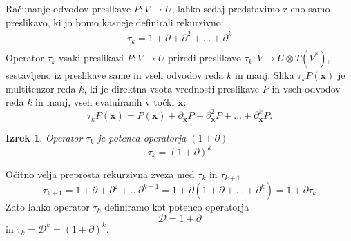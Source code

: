 \documentclass{article}
\newcommand{\x}{\mathbf{x}}
\newcommand{\D}{\partial}
\newcommand{\Dplus}{\mathcal{D}}
\newcommand{\sumd}{\tau}
\newtheorem{izrek}{Izrek}[section]
\begin{document}
Računanje odvodov preslkave $P:V\to U$, lahko sedaj predstavimo z eno samo
preslikavo, ki jo bomo kasneje definirali rekurzivno:
\begin{eqnarray}
  \label{eq:vsi_odvodi}
  \sumd_k = 1+\D +\D^2 +\ldots + \D^k\\ 
\end{eqnarray}
Operator $\sumd_k$ vsaki preslikavi $P: V\to U$ priredi preslikavo $\sumd_k:V\to
U\otimes T(V^*)$, sestavljeno iz preslikave same in vseh odvodov reda $k$ in
manj. Slika $\sumd_kP(\x)$ je multitenzor reda $k$, ki je direktna vsota
vrednosti preslikave $P$ in vseh odvodov reda $k$ in manj, vseh evaluiranih v
točki $\x$:
\begin{equation}
  \label{eq:multi_odvod}
  \sumd_kP(\x) = P(\x)+\D_\x P + \D^2_\x P + \ldots + \D^k_\x P.
\end{equation}
\begin{izrek}
  Operator $\sumd_k$ je potenca operatorja $(1+\D)$
  \begin{equation}
    \label{eq:potenca(1+d)}
    \tau_k=(1+\D)^k
  \end{equation}
\end{izrek}
Očitno velja preprosta rekurzivna zveza med $\sumd_k$ in $\sumd_{k+1}$
\begin{equation}
   \label{eq:rekurzija}
   \sumd_{k+1} = 1 + \D +\D^2+\ldots \D^{k+1} = 1+\D(1+\D+\ldots +\D^{k}) = 1+\D\sumd_k
\end{equation}
 Zato lahko operator $\sumd_k$ definiramo kot potenco operatorja 
 \begin{equation}
   \label{eq:dplus1}
   \Dplus = 1 + \D
 \end{equation}
in $\sumd_k=\Dplus^k=(1+\D)^k$. 
\end{document}

